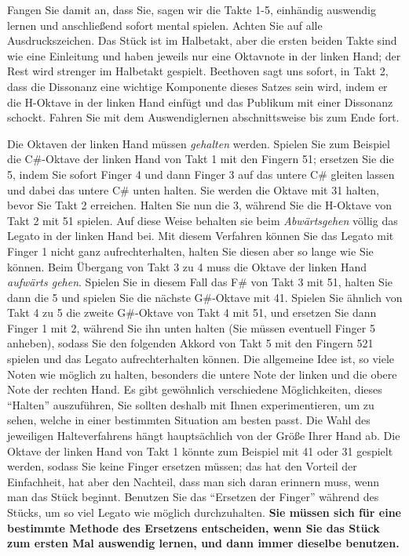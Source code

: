 Fangen Sie damit an, dass Sie, sagen wir die Takte 1-5, einhändig auswendig lernen und anschließend sofort mental spielen.
Achten Sie auf alle Ausdruckszeichen.
Das Stück ist im Halbetakt, aber die ersten beiden Takte sind wie eine Einleitung und haben jeweils nur eine Oktavnote in der linken Hand; der Rest wird strenger im Halbetakt gespielt.
Beethoven sagt uns sofort, in Takt 2, dass die Dissonanz eine wichtige Komponente dieses Satzes sein wird, indem er die H-Oktave in der linken Hand einfügt und das Publikum mit einer Dissonanz schockt.
Fahren Sie mit dem Auswendiglernen abschnittsweise bis zum Ende fort.

Die Oktaven der linken Hand müssen \textit{gehalten} werden.
Spielen Sie zum  Beispiel die C\#-Oktave der linken Hand von Takt 1 mit den Fingern 51; ersetzen Sie die 5, indem Sie sofort Finger 4 und dann Finger 3 auf das untere C\# gleiten lassen und dabei das untere C\# unten halten.
Sie werden die Oktave mit 31 halten, bevor Sie Takt 2 erreichen.
Halten Sie nun die 3, während Sie die H-Oktave von Takt 2 mit 51 spielen.
Auf diese Weise behalten sie beim \textit{Abwärtsgehen} völlig das Legato in der linken Hand bei.
Mit diesem Verfahren können Sie das Legato mit Finger 1 nicht ganz aufrechterhalten, halten Sie diesen aber so lange wie Sie können.
Beim Übergang von Takt 3 zu 4 muss die Oktave der linken Hand \textit{aufwärts gehen}.
Spielen Sie in diesem Fall das F\# von Takt 3 mit 51, halten Sie dann die 5 und spielen Sie die nächste G\#-Oktave mit 41.
Spielen Sie ähnlich von Takt 4 zu 5 die zweite G\#-Oktave von Takt 4 mit 51, und ersetzen Sie dann Finger 1 mit 2, während Sie ihn unten halten (Sie müssen eventuell Finger 5 anheben), sodass Sie den folgenden Akkord von Takt 5 mit den Fingern 521 spielen und das Legato aufrechterhalten können.
Die allgemeine Idee ist, so viele Noten wie möglich zu halten, besonders die untere Note der linken und die obere Note der rechten Hand.
Es gibt gewöhnlich verschiedene Möglichkeiten, dieses \enquote{Halten} auszuführen, Sie sollten deshalb mit Ihnen experimentieren, um zu sehen, welche in einer bestimmten Situation am besten passt.
Die Wahl des jeweiligen Halteverfahrens hängt hauptsächlich von der Größe Ihrer Hand ab.
Die Oktave der linken Hand von Takt 1 könnte zum Beispiel mit 41 oder 31 gespielt werden, sodass Sie keine Finger ersetzen müssen; das hat den Vorteil der Einfachheit, hat aber den Nachteil, dass man sich daran erinnern muss, wenn man das Stück beginnt.
Benutzen Sie das \enquote{Ersetzen der Finger} während des Stücks, um so viel Legato wie möglich durchzuhalten.
\textbf{Sie müssen sich für eine bestimmte Methode des Ersetzens entscheiden, wenn Sie das Stück zum ersten Mal auswendig lernen, und dann immer dieselbe benutzen.}

